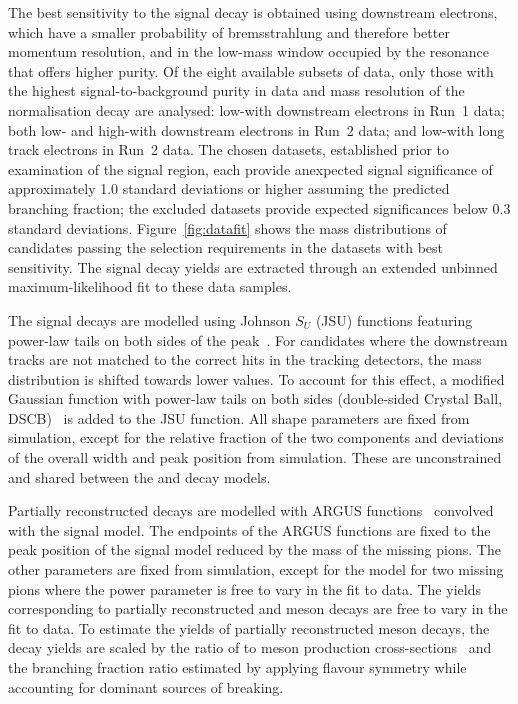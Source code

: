The best sensitivity to the signal decay is obtained using downstream electrons, which have a smaller probability of bremsstrahlung and therefore better momentum resolution, and in the low-mass window occupied by the \Kstarzv resonance that offers higher purity.
Of the eight available subsets of data, only those with the highest signal-to-background purity in data and mass resolution of the normalisation decay are analysed: low-\mkpi with downstream electrons in Run~1 data; both low- and high-\mkpi with downstream electrons in Run~2 data; and low-\mkpi with long track electrons in Run~2 data. The chosen datasets, established prior to examination of the signal region, each provide anexpected signal significance of approximately 1.0 standard deviations or higher assuming the predicted branching fraction; the excluded datasets provide expected significances below 0.3 standard deviations.
Figure~\ref{fig:datafit} shows the mass distributions of \kpig candidates passing the selection requirements in the datasets with best sensitivity.
The signal decay yields are extracted through an extended unbinned maximum-likelihood fit to these data samples.

The \bdskpig signal decays are modelled using Johnson $S_U$ (JSU) functions featuring power-law tails on both sides of the peak~\cite{JohnsonSU}.
For candidates where the downstream tracks are not matched to the correct hits in the tracking detectors, the mass distribution is shifted towards lower values.
To account for this effect, a modified Gaussian function with power-law tails on both sides (double-sided Crystal Ball, DSCB)~\cite{Skwarnicki:1986xj} is added to the JSU function.
All shape parameters are fixed from simulation, except for the relative fraction of the two components and deviations of the overall width and peak position from simulation. These are unconstrained and shared between the \Bd and \bskpig decay models.

Partially reconstructed \mbox{\decay{\B}{\Km\pip\pi(\pi)\gamma}} decays are modelled with ARGUS functions~\cite{ARGUS:1990hfq} convolved with the signal model.
The endpoints of the ARGUS functions are fixed to the peak position of the signal model reduced by the mass of the missing pions.
The other parameters are fixed from simulation, except for the model for two missing pions where the power parameter is free to vary in the fit to data.
The yields corresponding to partially reconstructed \Bd and \Bp meson decays are free to vary in the fit to data.
To estimate the yields of partially reconstructed \Bs meson decays, the \mbox{\decay{\B}{\Km\pip\pi(\pi)\gamma}} decay yields are scaled by the ratio of \Bs to \B meson production cross-sections~\cite{LHCb-PAPER-2020-046} and the branching fraction ratio estimated by applying \grpsuthree flavour symmetry while accounting for dominant sources of \grpsuthree breaking.

